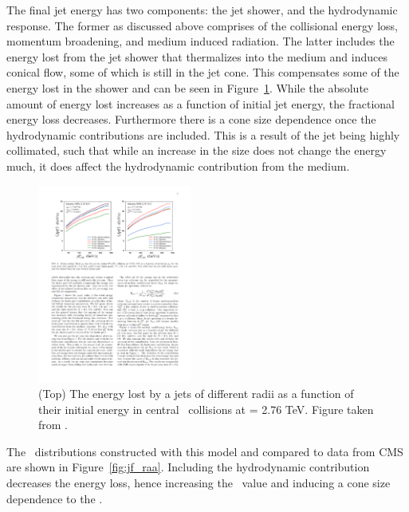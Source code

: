 The final jet energy has two components: the jet shower, and the hydrodynamic response. The former as discussed above comprises of the collisional energy loss, momentum broadening, and medium induced radiation. The latter includes the energy lost from the jet shower that thermalizes into the medium and induces conical flow, some of which is still in the jet cone. This compensates some of the energy lost in the shower and can be seen in Figure~\ref{fig:jf_energyLoss}. While the absolute amount of energy lost increases as a function of initial jet energy, the fractional energy loss decreases. Furthermore there is a cone size dependence once the hydrodynamic contributions are included. This is a result of the jet being highly collimated, such that while an increase in the size does not change the energy much, it does affect the hydrodynamic contribution from the medium.
\begin{figure}[htbp]
\begin{center}
\includegraphics[width=0.45\textwidth]{figures/jetMeasurements/JF_energyLoss}
\caption{(Top) The energy lost by a jets of different radii as a function of their initial energy in central \pbpb\ collisions at \sqrtsnn = 2.76 TeV. Figure taken from \cite{Tachibana:2017syd}.}
\label{fig:jf_energyLoss}
\end{center}
\end{figure}

The \RAA\ distributions constructed with this model and compared to data from CMS \cite{Khachatryan:2016jfl} are shown in Figure~\ref{fig:jf_raa}. Including the hydrodynamic contribution decreases the energy loss, hence increasing the \RAA\ value and inducing a cone size dependence to the \RAA. 

